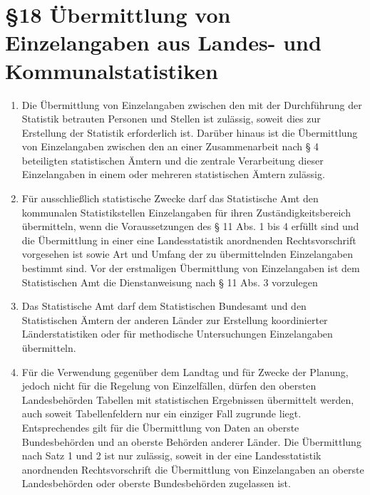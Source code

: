     \section[Übermittlung von Einzelangaben]{\S18 Übermittlung von Einzelangaben aus Landes- und Kommunalstatistiken}
        \begin{enumerate}
            \item Die Übermittlung von Einzelangaben zwischen den mit der Durchführung der Statistik betrauten Personen und Stellen ist zulässig, soweit dies zur Erstellung der Statistik erforderlich ist. Darüber hinaus ist die Übermittlung von Einzelangaben zwischen den an einer Zusammenarbeit nach § 4 beteiligten statistischen Ämtern und die zentrale Verarbeitung dieser Einzelangaben in einem oder mehreren statistischen Ämtern zulässig.
            \item Für ausschließlich statistische Zwecke darf das Statistische Amt den kommunalen Statistikstellen Einzelangaben für ihren Zuständigkeitsbereich übermitteln, wenn die Voraussetzungen des § 11 Abs. 1 bis 4 erfüllt sind und die Übermittlung in einer eine Landesstatistik anordnenden Rechtsvorschrift vorgesehen ist sowie Art und Umfang der zu übermittelnden Einzelangaben bestimmt sind. Vor der erstmaligen Übermittlung von Einzelangaben ist dem Statistischen Amt die Dienstanweisung nach § 11 Abs. 3 vorzulegen
            \item Das Statistische Amt darf dem Statistischen Bundesamt und den Statistischen Ämtern der anderen Länder zur Erstellung koordinierter Länderstatistiken oder für methodische Untersuchungen Einzelangaben übermitteln.
            \item Für die Verwendung gegenüber dem Landtag und für Zwecke der Planung, jedoch nicht für die Regelung von Einzelfällen, dürfen den obersten Landesbehörden Tabellen mit statistischen Ergebnissen übermittelt werden, auch soweit Tabellenfeldern nur ein einziger Fall zugrunde liegt. Entsprechendes gilt für die Übermittlung von Daten an oberste Bundesbehörden und an oberste Behörden anderer Länder. Die Übermittlung nach Satz 1 und 2 ist nur zulässig, soweit in der eine Landesstatistik anordnenden Rechtsvorschrift die Übermittlung von Einzelangaben an oberste Landesbehörden oder oberste Bundesbehörden zugelassen ist.

\end{enumerate}
